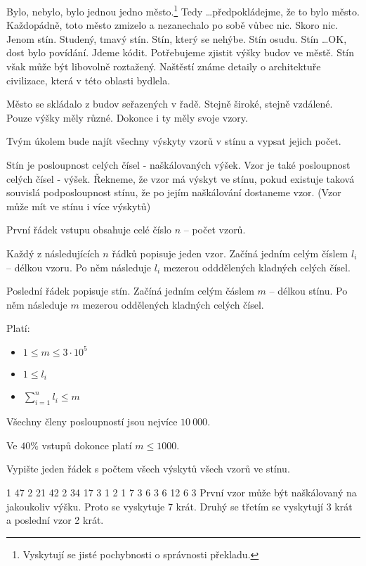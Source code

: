 





Bylo, nebylo, bylo jednou jedno město.\footnote{Vyskytují se jisté pochybnosti o správnosti překladu.}
Tedy \dots předpokládejme, že to bylo město.
Každopádně, toto město zmizelo a nezanechalo po sobě vůbec nic.
Skoro nic. Jenom stín. Studený, tmavý stín.
Stín, který se nehýbe. Stín osudu.
Stín \dots OK, dost bylo povídání.
Jdeme kódit.
Potřebujeme zjistit výšky budov ve městě.
Stín však může být libovolně roztažený.
Naštěstí známe detaily o architektuře civilizace, která v této oblasti bydlela.

Město se skládalo z budov seřazených v řadě.
Stejně široké, stejně vzdálené. Pouze výšky měly různé.
Dokonce i ty měly svoje vzory.

Tvým úkolem bude najít všechny výskyty vzorů v stínu a vypsat jejich počet.


Stín je posloupnost celých čísel - naškálovaných výšek.
Vzor je také posloupnost celých čísel - výšek.
Řekneme, že vzor má výskyt ve stínu,
pokud existuje taková souvislá podposloupnost stínu,
že po jejím naškálování dostaneme vzor.
(Vzor může mít ve stínu i více výskytů)


První řádek vstupu obsahuje celé číslo $n$
-- počet vzorů.

Každý z následujících $n$ řádků popisuje jeden vzor.
Začíná jedním celým číslem $l_i$ -- délkou vzoru.
Po něm následuje $l_i$ mezerou odddělených kladných celých čísel.

Poslední řádek popisuje stín.
Začíná jedním celým čáslem $m$ -- délkou stínu.
Po něm následuje $m$ mezerou oddělených kladných celých čísel.

\bigskip

\noindent
Platí:

\begin{itemize}
  \item $1 \leq m \leq 3\cdot10^5$
  \item $1 \leq l_i$
  \item $\sum^{n}_{i=1} l_i \leq m$
\end{itemize}
Všechny členy posloupností jsou nejvíce $10\ 000$.

\smallskip

\noindent
Ve $40\%$ vstupů dokonce platí $m \leq 1000$.


Vypište jeden řádek s počtem všech výskytů
všech vzorů ve stínu.



1 47
2 21 42
2 34 17
3 1 2 1
7 3 6 3 6 12 6 3
\sampleCOMMENT
První vzor může být naškálovaný na jakoukoliv výšku.
Proto se vyskytuje 7 krát. Druhý se třetím se
vyskytují 3 krát a poslední vzor 2 krát.
\sampleEND



